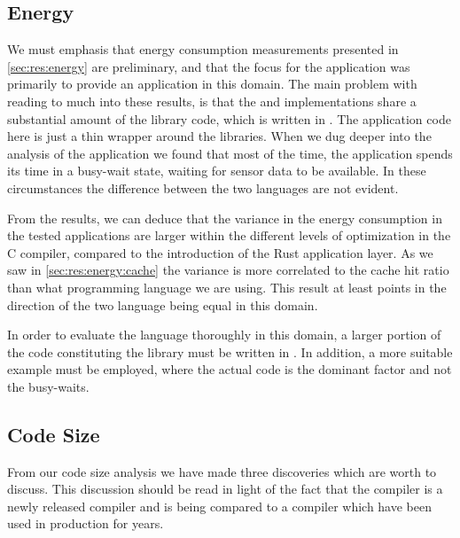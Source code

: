 \subsection{Energy}

We must emphasis that energy consumption measurements presented in \autoref{sec:res:energy} are preliminary, and that the focus for the {\tracker} application was primarily to provide an application in this domain.
The main problem with reading to much into these results, is that the {\rust} and {\C} implementations share a substantial amount of the library code, which is written in {\C}.
The application code here is just a thin wrapper around the libraries.
When we dug deeper into the analysis of the application we found that most of the time, the application spends its time in a busy-wait state, waiting for sensor data to be available.
In these circumstances the difference between the two languages are not evident.

From the results, we can deduce that the variance in the energy consumption in the tested applications are larger within the different levels of optimization in the C compiler, compared to the introduction of the Rust application layer.
As we saw in \autoref{sec:res:energy:cache} the variance is more correlated to the cache hit ratio than what programming language we are using.
This result at least points in the direction of the two language being equal in this domain.

In order to evaluate the {\rust} language thoroughly in this domain, a larger portion of the code constituting the library must be written in {\rust}.
In addition, a more suitable example must be employed, where the actual code is the dominant factor and not the busy-waits.

\subsection{Code Size}

From our code size analysis we have made three discoveries which are worth to discuss.
This discussion should be read in light of the fact that the {\rust} compiler is a newly released compiler and is being compared to a {\C} compiler which have been used in production for years.


